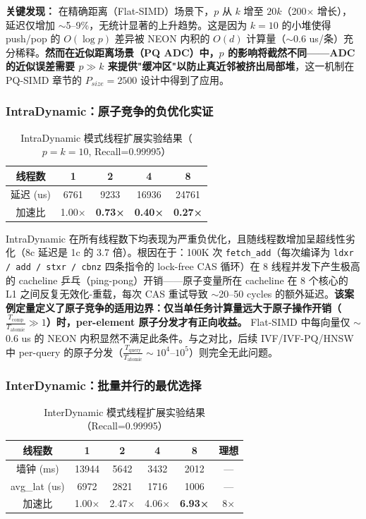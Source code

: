 \documentclass[UTF8,a4paper,10pt]{ctexart}
\begin{document}
\textbf{关键发现：} 在精确距离（Flat-SIMD）场景下，$p$ 从 $k$ 增至 $20k$（200× 增长），延迟仅增加 $\sim$5--9\%，无统计显著的上升趋势。这是因为 $k=10$ 的小堆使得 push/pop 的 $O(\log p)$ 差异被 NEON 内积的 $O(d)$ 计算量（$\sim$0.6 us/条）充分稀释。\textbf{然而在近似距离场景（PQ ADC）中，$p$ 的影响将截然不同——ADC 的近似误差需要 $p \gg k$ 来提供"缓冲区"以防止真近邻被挤出局部堆}，这一机制在 PQ-SIMD 章节的 $P_{size}=2500$ 设计中得到了应用。

\subsubsection{IntraDynamic：原子竞争的负优化实证}

\begin{table}[H]
\centering
\caption{IntraDynamic 模式线程扩展实验结果（$p=k=10$, Recall=0.99995）}
\begin{tabular}{ccccc}
\hline
线程数 & 1 & 2 & 4 & 8 \\
\hline
延迟 (us) & 6761 & 9233 & 16936 & 24761 \\
加速比 & 1.00× & \textbf{0.73×} & \textbf{0.40×} & \textbf{0.27×} \\
\hline
\end{tabular}
\end{table}

IntraDynamic 在所有线程数下均表现为严重负优化，且随线程数增加呈超线性劣化（8c 延迟是 1c 的 3.7 倍）。根因在于：100K 次 \texttt{fetch\_add}（每次编译为 \texttt{ldxr / add / stxr / cbnz} 四条指令的 lock-free CAS 循环）在 8 线程并发下产生极高的 cacheline 乒乓（ping-pong）开销——原子变量所在 cacheline 在 8 个核心的 L1 之间反复无效化-重载，每次 CAS 重试导致 $\sim$20--50 cycles 的额外延迟。\textbf{该案例定量定义了原子竞争的适用边界：仅当单任务计算量远大于原子操作开销（$\frac{T_{\text{comp}}}{T_{\text{atomic}}} \gg 1$）时，per-element 原子分发才有正向收益。} Flat-SIMD 中每向量仅 $\sim$0.6 us 的 NEON 内积显然不满足此条件。与之对比，后续 IVF/IVF-PQ/HNSW 中 per-query 的原子分发（$\frac{T_{\text{query}}}{T_{\text{atomic}}} \sim 10^4$--$10^5$）则完全无此问题。

\subsubsection{InterDynamic：批量并行的最优选择}

\begin{table}[H]
\centering
\caption{InterDynamic 模式线程扩展实验结果（Recall=0.99995）}
\begin{tabular}{cccccc}
\hline
线程数 & 1 & 2 & 4 & 8 & 理想 \\
\hline
墙钟 (ms) & 13944 & 5642 & 3432 & 2012 & — \\
avg\_lat (us) & 6972 & 2821 & 1716 & 1006 & — \\
加速比 & 1.00× & 2.47× & 4.06× & \textbf{6.93×} & 8× \\
\hline
\end{tabular}
\end{table}
\end{document}
